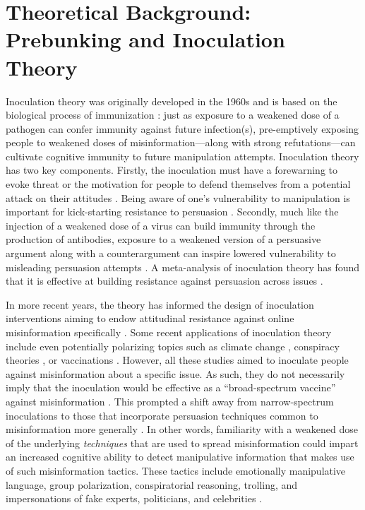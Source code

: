 \documentclass[empirical, authordate]{jote-new-article}
\begin{document}
\section{Theoretical Background: Prebunking and Inoculation Theory}

Inoculation theory was originally developed in the 1960s and is based on the biological process of immunization \parencite{McGuire1964, McGuire1961}: just as exposure to a weakened dose of a pathogen can confer immunity against future infection(s), pre-emptively exposing people to weakened doses of misinformation—along with strong refutations—can cultivate cognitive immunity to future manipulation attempts. Inoculation theory has two key components. Firstly, the inoculation must have a forewarning to evoke threat or the motivation for people to defend themselves from a potential attack on their attitudes \parencite{Compton2012}. Being aware of one's vulnerability to manipulation is important for kick-starting resistance to persuasion \parencite{Sagarin2002}. Secondly, much like the injection of a weakened dose of a virus can build immunity through the production of antibodies, exposure to a weakened version of a persuasive argument along with a counterargument can inspire lowered vulnerability to misleading persuasion attempts \parencite{McGuire1961}. A meta-analysis of inoculation theory has found that it is effective at building resistance against persuasion across issues \parencite{Banas2010}.

In more recent years, the theory has informed the design of inoculation interventions aiming to endow attitudinal resistance against online misinformation specifically \parencite[for in-depth reviews see][]{Compton2021a, Lewandowsky2021, Roozenbeek2018, vanderLinden2022}. Some recent applications of inoculation theory include even potentially polarizing topics such as climate change \parencite{vanderLinden2017}, conspiracy theories \parencite{Banas2013}, or vaccinations \parencite{Jolley2017}. However, all these studies aimed to inoculate people against misinformation about a specific issue. As such, they do not necessarily imply that the inoculation would be effective as a “broad-spectrum vaccine” against misinformation \parencite{Roozenbeek2018}. This prompted a shift away from narrow-spectrum inoculations to those that incorporate persuasion techniques common to misinformation more generally \parencite{Cook2017, Roozenbeek2019}. In other words, familiarity with a weakened dose of the underlying \emph{techniques} that are used to spread misinformation could impart an increased cognitive ability to detect manipulative information that makes use of such misinformation tactics. These tactics include emotionally manipulative language, group polarization, conspiratorial reasoning, trolling, and impersonations of fake experts, politicians, and celebrities \parencite{Roozenbeek2019}.
\end{document}
